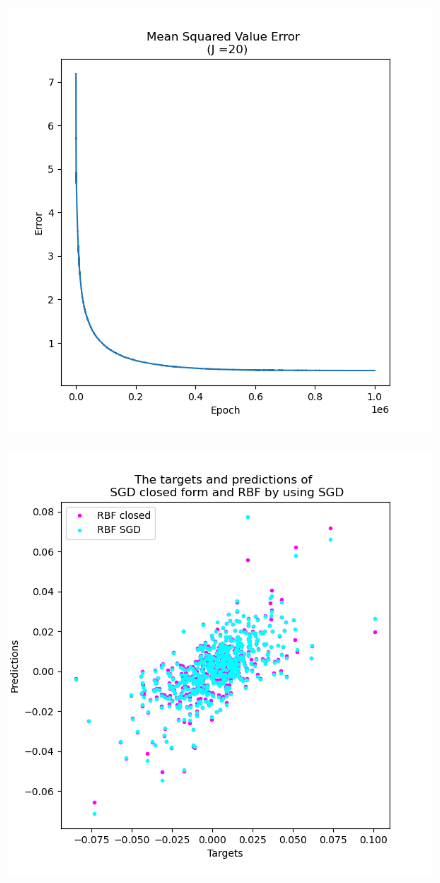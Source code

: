 \documentclass[sigconf]{acmart}
\begin{document}
  \begin{figure}
    \centering
    \begin{minipage}{.3\textwidth}
      \centering
      \includegraphics[width=.8\linewidth]{../RBF-R/LOSS-1000000.png}
      \label{fig:LOSS1000000}
    \end{minipage}%
    \begin{minipage}{.3\textwidth}
      \centering
      \includegraphics[width=.8\linewidth]{../RBF-R/SGD-1000000.png}
      \label{fig:SGD1000000}
    \end{minipage}

\end{figure}
\end{document}
